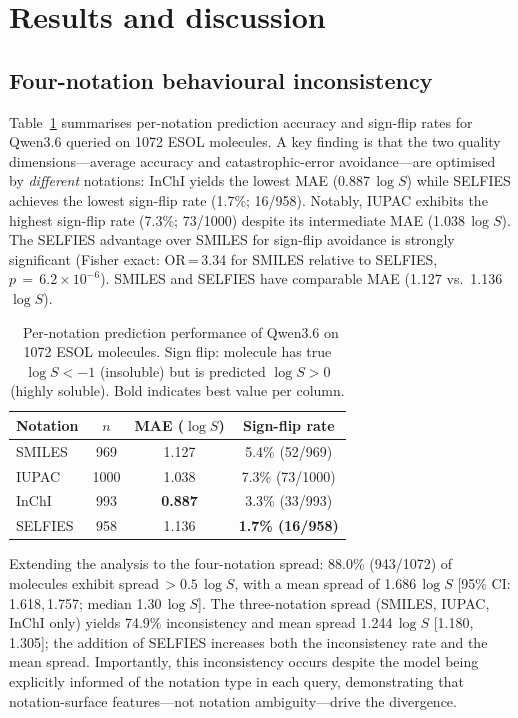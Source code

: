 \documentclass[twoside,twocolumn,9pt]{article}
\newcommand{\logS}{\ensuremath{\log S}}
\begin{document}
\section{Results and discussion}

\subsection{Four-notation behavioural inconsistency}

Table~\ref{tbl:notation} summarises per-notation prediction accuracy and sign-flip rates for Qwen3.6 queried on 1072 ESOL molecules. A key finding is that the two quality dimensions---average accuracy and catastrophic-error avoidance---are optimised by \textit{different} notations: InChI yields the lowest MAE (0.887\,$\logS$) while SELFIES achieves the lowest sign-flip rate (1.7\%; 16/958). Notably, IUPAC exhibits the highest sign-flip rate (7.3\%; 73/1000) despite its intermediate MAE (1.038\,$\logS$). The SELFIES advantage over SMILES for sign-flip avoidance is strongly significant (Fisher exact: OR\,=\,3.34 for SMILES relative to SELFIES, $p\,=\,6.2\!\times\!10^{-6}$). SMILES and SELFIES have comparable MAE (1.127 vs.\ 1.136\,$\logS$).

\begin{table}[h]
\small
\caption{\ Per-notation prediction performance of Qwen3.6 on 1072 ESOL molecules. Sign flip: molecule has true $\logS < -1$ (insoluble) but is predicted $\logS > 0$ (highly soluble). Bold indicates best value per column.}
\label{tbl:notation}
\begin{tabular*}{0.48\textwidth}{@{\extracolsep{\fill}}lccc}
\hline
Notation & $n$ & MAE ($\logS$) & Sign-flip rate \\
\hline
SMILES  & 969  & 1.127 & 5.4\% (52/969) \\
IUPAC   & 1000 & 1.038 & 7.3\% (73/1000) \\
InChI   & 993  & \textbf{0.887} & 3.3\% (33/993) \\
SELFIES & 958  & 1.136 & \textbf{1.7\% (16/958)} \\
\hline
\end{tabular*}
\end{table}

Extending the analysis to the four-notation spread: 88.0\% (943/1072) of molecules exhibit spread\,$>0.5$\,$\logS$, with a mean spread of 1.686\,$\logS$ [95\% CI: 1.618,\,1.757; median 1.30\,$\logS$]. The three-notation spread (SMILES, IUPAC, InChI only) yields 74.9\% inconsistency and mean spread 1.244\,$\logS$ [1.180,\,1.305]; the addition of SELFIES increases both the inconsistency rate and the mean spread. Importantly, this inconsistency occurs despite the model being explicitly informed of the notation type in each query, demonstrating that notation-surface features---not notation ambiguity---drive the divergence.
\end{document}
